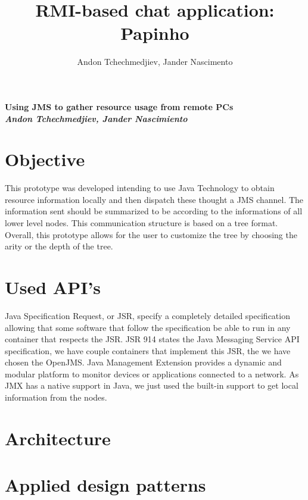 \documentclass{article} %
\title {RMI-based chat application: Papinho}
\author{Andon Tchechmedjiev, Jander Nascimento}
\begin{document}
{\Large {\bf Using JMS to gather resource usage from remote PCs}} \\
{\large {\bf {\it Andon Tchechmedjiev, Jander Nascimiento}}}
\section{Objective}
This prototype was developed intending to use Java Technology to obtain resource information locally and then dispatch these thought a JMS channel.
The information sent should be summarized to be according to the informations of all lower level nodes.
This communication structure is based on a tree format.
Overall, this prototype allows for the user to customize the tree by choosing the arity or the depth of the tree.

\section{Used API's}

Java Specification Request, or JSR, specify a completely detailed specification allowing that some software that follow the specification be able to run in any container that respects the JSR.
JSR 914 states the Java Messaging Service API specification, we have couple containers that implement this JSR, the we have chosen the OpenJMS.
Java Management Extension provides a dynamic and modular platform to monitor devices or applications connected to a network.
As JMX has a native support in Java, we just used the built-in support to get local information from the nodes. 

\section{Architecture}
\section{Applied design patterns}
\end{document}
